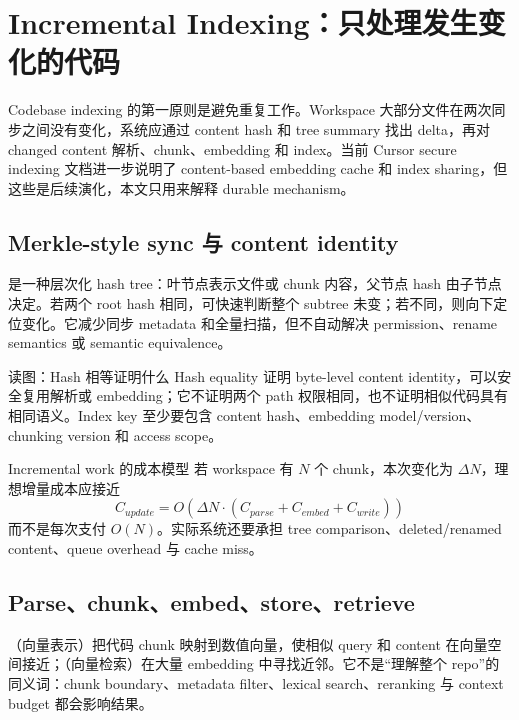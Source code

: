 \section{Incremental Indexing：只处理发生变化的代码}

Codebase indexing 的第一原则是避免重复工作。Workspace 大部分文件在两次同步之间没有变化，系统应通过 content hash 和 tree summary 找出 delta，再对 changed content 解析、chunk、embedding 和 index。当前 Cursor secure indexing 文档进一步说明了 content-based embedding cache 和 index sharing，但这些是后续演化，本文只用来解释 durable mechanism。

\subsection{Merkle-style sync 与 content identity}

 是一种层次化 hash tree：叶节点表示文件或 chunk 内容，父节点 hash 由子节点决定。若两个 root hash 相同，可快速判断整个 subtree 未变；若不同，则向下定位变化。它减少同步 metadata 和全量扫描，但不自动解决 permission、rename semantics 或 semantic equivalence。


\begin{knowledgebox}{读图：Hash 相等证明什么}
Hash equality 证明 byte-level content identity，可以安全复用解析或 embedding；它不证明两个 path 权限相同，也不证明相似代码具有相同语义。Index key 至少要包含 content hash、embedding model/version、chunking version 和 access scope。
\end{knowledgebox}

\begin{importantbox}{Incremental work 的成本模型}
若 workspace 有 $N$ 个 chunk，本次变化为 $\Delta N$，理想增量成本应接近
\[
C_{update}=O(\Delta N\cdot(C_{parse}+C_{embed}+C_{write}))
\]
而不是每次支付 $O(N)$。实际系统还要承担 tree comparison、deleted/renamed content、queue overhead 与 cache miss。
\end{importantbox}

\subsection{Parse、chunk、embed、store、retrieve}

（向量表示）把代码 chunk 映射到数值向量，使相似 query 和 content 在向量空间接近；（向量检索）在大量 embedding 中寻找近邻。它不是“理解整个 repo”的同义词：chunk boundary、metadata filter、lexical search、reranking 与 context budget 都会影响结果。

